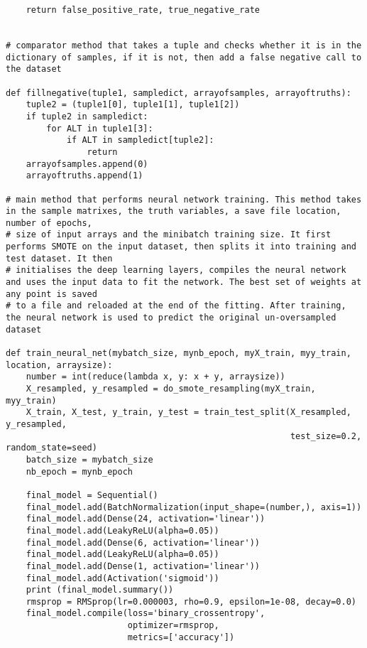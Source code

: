 \documentclass{article}
\begin{document}
\begin{verbatim}
    return false_positive_rate, true_negative_rate


# comparator method that takes a tuple and checks whether it is in the dictionary of samples, if it is not, then add a false negative call to the dataset
	
def fillnegative(tuple1, sampledict, arrayofsamples, arrayoftruths):
    tuple2 = (tuple1[0], tuple1[1], tuple1[2])
    if tuple2 in sampledict:
        for ALT in tuple1[3]:
            if ALT in sampledict[tuple2]:
                return
    arrayofsamples.append(0)
    arrayoftruths.append(1)

# main method that performs neural network training. This method takes in the sample matrixes, the truth variables, a save file location, number of epochs, 
# size of input arrays and the minibatch training size. It first performs SMOTE on the input dataset, then splits it into training and test dataset. It then
# initialises the deep learning layers, compiles the neural network and uses the input data to fit the network. The best set of weights at any point is saved
# to a file and reloaded at the end of the fitting. After training, the neural network is used to predict the original un-oversampled dataset
	
def train_neural_net(mybatch_size, mynb_epoch, myX_train, myy_train, location, arraysize):
    number = int(reduce(lambda x, y: x + y, arraysize))
    X_resampled, y_resampled = do_smote_resampling(myX_train, myy_train)
    X_train, X_test, y_train, y_test = train_test_split(X_resampled, y_resampled,
                                                        test_size=0.2, random_state=seed)
    batch_size = mybatch_size
    nb_epoch = mynb_epoch

    final_model = Sequential()
    final_model.add(BatchNormalization(input_shape=(number,), axis=1))
    final_model.add(Dense(24, activation='linear'))
    final_model.add(LeakyReLU(alpha=0.05))
    final_model.add(Dense(6, activation='linear'))
    final_model.add(LeakyReLU(alpha=0.05))
    final_model.add(Dense(1, activation='linear'))
    final_model.add(Activation('sigmoid'))
    print (final_model.summary())
    rmsprop = RMSprop(lr=0.000003, rho=0.9, epsilon=1e-08, decay=0.0)
    final_model.compile(loss='binary_crossentropy',
                        optimizer=rmsprop,
                        metrics=['accuracy'])


\end{verbatim}
\end{document}
